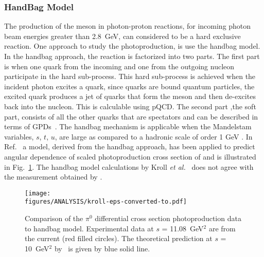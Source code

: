 \subsubsection{HandBag Model}
The production of the \piz meson in photon-proton reactions, for incoming photon beam energies greater than 2.8~GeV, can considered to be a hard exclusive reaction. One approach to study the \piz photoproduction, is use the handbag model. In the handbag approach, the reaction is factorized into two parts. The first part is when one quark from the incoming and one from the outgoing nucleon participate in the hard sub-process. This hard sub-process is achieved when the incident photon excites a quark, since quarks are bound quantum particles, the excited quark produces a jet of quarks that form the meson and then de-excites back into the nucleon. This is calculable using pQCD. The second part ,the soft part, consists of all the other quarks that are spectators and can be described in terms of GPDs~\cite{key1, key2,Rad1996, Diehl}. The handbag mechanism is applicable when the Mandelstam variables, $s$, $t$, $u$, are large as compared to a hadronic scale of order 1 GeV . In Ref.~\cite{Huang2000} a model, derived from the handbag approach, has been applied to predict angular dependence of scaled photoproduction cross section of \piz and is illustrated in Fig.~\ref{fig:pi0_handbag}. The handbag model calculations by Kroll \textit{et al.}~\cite{Huang2000} does not agree with the measurement obtained by .
\begin{figure}[h]
	\texttt{[image: \\figures/ANALYSIS/kroll-eps-converted-to.pdf]}
	\caption{Comparison of the $\pi^0$ differential cross section  photoproduction data to  handbag model. Experimental data at $s$ = 11.08~GeV$^2$ are from the current (red filled circles). The theoretical prediction at $s$ = 10~GeV$^2$ by~\protect\cite{Huang2000} is given by blue solid line. } \label{fig:pi0_handbag}
\end{figure}